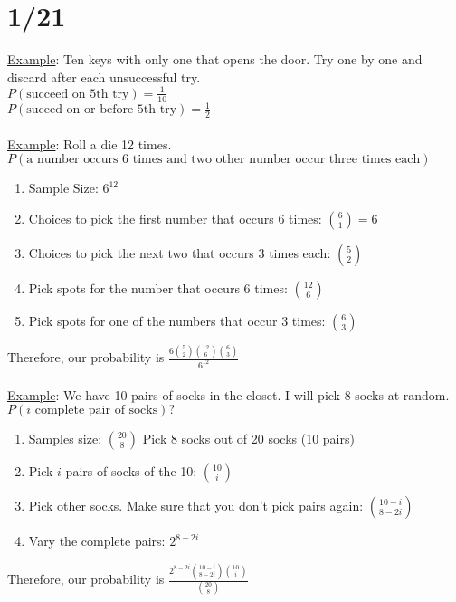 \section*{1/21}
  \underline{Example}: Ten keys with only one that opens the door. 
  Try one by one and discard after each unsuccessful try.\\
  $P(\text{succeed on 5th try}) = \frac{1}{10}$\\
  $P(\text{suceed on or before 5th try}) = \frac{1}{2}$\\\\
  \underline{Example}: Roll a die 12 times.\\
  $P(\text{a number occurs 6 times and two other number occur three 
  times each})$\\
  \begin{enumerate}
    \item Sample Size: $6^{12}$
    \item Choices to pick the first number that occurs 6 times: 
      $\binom{6}{1} = 6$
    \item Choices to pick the next two that occurs 3 times each:
      $\binom{5}{2}$
    \item Pick spots for the number that occurs 6 times:
      $\binom{12}{6}$
    \item Pick spots for one of the numbers that occur 3 times:
      $\binom{6}{3}$
  \end{enumerate}
  Therefore, our probability is $\frac{6\binom{5}{2}\binom{12}{6}
  \binom{6}{3}}{6^{12}}$\\\\
  \underline{Example}: We have 10 pairs of socks in the closet. I will
  pick 8 socks at random.\\
  $P(\text{$i$ complete pair of socks})?$\\
  \begin{enumerate}
    \item Samples size: $\binom{20}{8}$ Pick 8 socks out of 20 socks (10 pairs)
    \item Pick $i$ pairs of socks of the 10: $\binom{10}{i}$
    \item Pick other socks. Make sure that you don't pick pairs again:
      $\binom{10-i}{8-2i}$
    \item Vary the complete pairs: $2^{8-2i}$
  \end{enumerate}
  Therefore, our probability is $\frac{2^{8-2i}\binom{10-i}{8-2i}\binom{10}{i}}
  {\binom{20}{8}}$\\\\
